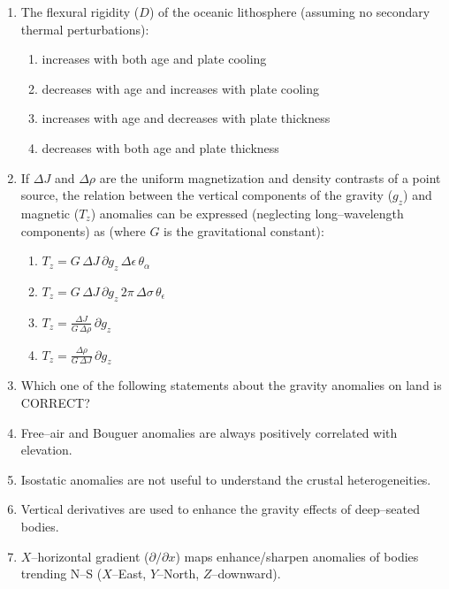 \documentclass[journal,12pt,onecolumn]{IEEEtran}
\theoremstyle{remark}
\begin{document}
\begin{enumerate}
\item The flexural rigidity ($D$) of the oceanic lithosphere (assuming no secondary thermal 
perturbations):
\begin{enumerate}
\item increases with both age and plate cooling
\item decreases with age and increases with plate cooling
\item increases with age and decreases with plate thickness
\item decreases with both age and plate thickness
\end{enumerate}
\vspace{0.5cm}

\item If $\Delta J$ and $\Delta \rho$ are the uniform magnetization and density contrasts of a point 
source, the relation between the vertical components of the gravity ($g_z$) and magnetic ($T_z$) 
anomalies can be expressed (neglecting long--wavelength components) as (where $G$ is the gravitational constant):
\begin{enumerate}
\item $T_z = G\,\Delta J \, \partial g_z \, \Delta\epsilon \, \theta_\alpha$
\item $T_z = G\,\Delta J \, \partial g_z \, 2\pi\,\Delta\sigma \, \theta_\epsilon$
\item $T_z = \frac{\Delta J}{G\,\Delta\rho}\,\partial g_z$
\item $T_z = \frac{\Delta\rho}{G\,\Delta J}\,\partial g_z$
\end{enumerate}
\vspace{0.5cm}

\item Which one of the following statements about the gravity anomalies on land is CORRECT?
\vspace{0.5cm}
\item Free--air and Bouguer anomalies are always positively correlated with elevation.
\vspace{0.5cm}

\item Isostatic anomalies are not useful to understand the crustal heterogeneities.
\vspace{0.5cm}

\item Vertical derivatives are used to enhance the gravity effects of deep--seated bodies.
\vspace{0.5cm}

\item $X$--horizontal gradient ($\partial/\partial x$) maps enhance/sharpen anomalies of bodies trending N--S ($X$--East, $Y$--North, $Z$--downward).
\vspace{0.5cm}




\end{enumerate}
\end{document}
